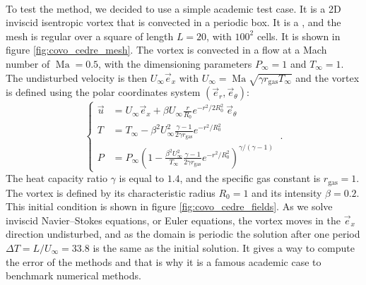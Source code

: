     \paragraph{}
    To test the method, we decided to use a simple academic test case.
    It is a 2D inviscid isentropic vortex that is convected in a periodic box.
    It is a , and the mesh is regular over a square of length $L = 20$, with $100^2$ cells.
    It is shown in figure \ref{fig:covo_cedre_mesh}.
    The vortex is convected in a flow at a Mach number of $\operatorname{Ma} = 0.5$, with the dimensioning parameters $P_\infty = 1$ and $T_\infty = 1$.
    The undisturbed velocity is then $U_\infty \vec{e}_x$ with $U_\infty = \operatorname{Ma} \sqrt{\gamma r_\textrm{gas} T_\infty}$ and the vortex is defined using the polar coordinates system $\left(\vec{e}_r, \vec{e}_\theta\right)$:
    \begin{equation}\label{eq:covo}
      \left\{\begin{aligned}
        \vec{u} &= U_\infty \vec{e}_x + \beta U_\infty \frac{r}{R_0} e^{-r^2 / 2 R_0^2} \ \vec{e}_\theta \\[10pt]
        T &= T_\infty - \beta^2 U_\infty^2 \frac{\gamma - 1}{2 \gamma r_\textrm{gas}} e^{-r^2 / R_0^2} \\[10pt]
        P &= P_\infty \left( 1 - \frac{\beta^2 U_\infty^2}{T_\infty} \frac{\gamma - 1}{2 \gamma r_\textrm{gas}} e^{-r^2 / R_0^2} \right)^{\gamma/\left(\gamma - 1\right)}
      \end{aligned}\right. \ .
    \end{equation}
    The heat capacity ratio $\gamma$ is equal to $1.4$, and the specific gas constant is $r_\textrm{gas} = 1$.
    The vortex is defined by its characteristic radius $R_0 = 1$ and its intensity $\beta = 0.2$.
    This initial condition is shown in figure \ref{fig:covo_cedre_fields}.
    As we solve inviscid Navier--Stokes equations, or Euler equations, the vortex moves in the $\vec{e}_x$ direction undisturbed, and as the domain is periodic the solution after one period $\Delta T = L/U_\infty = 33.8$ is the same as the initial solution.
    It gives a way to compute the error of the methods and that is why it is a famous academic case to benchmark numerical methods.


